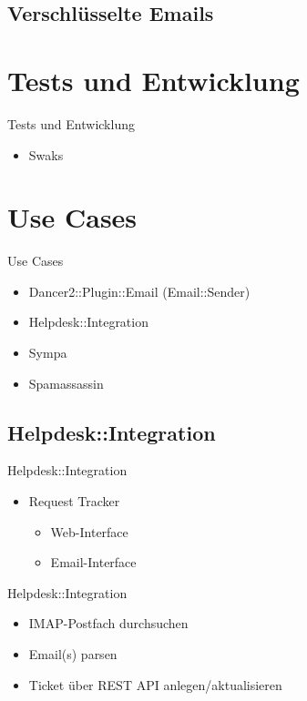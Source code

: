 \subsection{Verschlüsselte Emails}

\section{Tests und Entwicklung}

\begin{frame}{Tests und Entwicklung}
  \begin{itemize}
  \item Swaks
  \end{itemize}
\end{frame}

\section{Use Cases}

\begin{frame}{Use Cases}
  \begin{itemize}
  \item Dancer2::Plugin::Email (Email::Sender)
  \item Helpdesk::Integration
  \item Sympa
  \item Spamassassin
  \end{itemize}
\end{frame}

\subsection{Helpdesk::Integration}

\begin{frame}{Helpdesk::Integration}
  \begin{itemize}
  \item Request Tracker
    \begin{itemize}
    \item Web-Interface
    \item Email-Interface
    \end{itemize}
  \end{itemize}
\end{frame}

\begin{frame}{Helpdesk::Integration}
  \begin{itemize}
  \item IMAP-Postfach durchsuchen
  \item Email(s) parsen
  \item Ticket über REST API anlegen/aktualisieren
  \end{itemize}
\end{frame}

